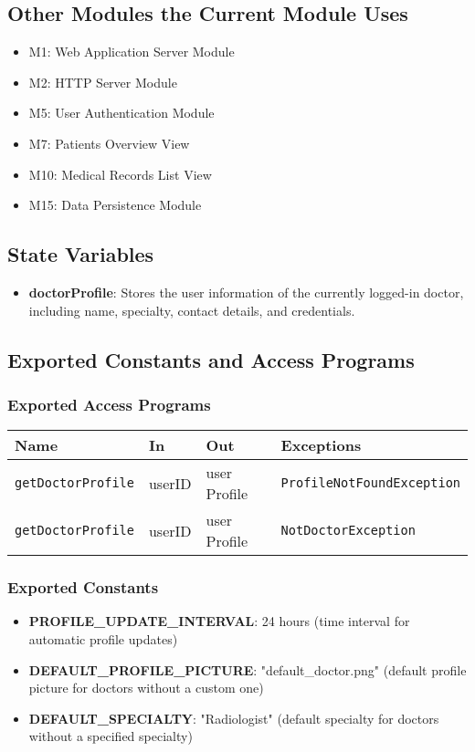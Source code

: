 \documentclass[12pt, titlepage]{article}
\begin{document}
\subsection{Other Modules the Current Module Uses}
\begin{itemize}
    \item M1: Web Application Server Module
    \item M2: HTTP Server Module
    \item M5: User Authentication Module
    \item M7: Patients Overview View
    \item M10: Medical Records List View
    \item M15: Data Persistence Module
\end{itemize}

\subsection{State Variables}
\begin{itemize}
    \item \textbf{doctorProfile}: Stores the user information of the currently logged-in doctor, including name, specialty, contact details, and credentials.
\end{itemize}

\subsection{Exported Constants and Access Programs}
\subsubsection{Exported Access Programs}
\begin{tabular}{|l|l|l|l|}
    \hline
    \textbf{Name} & \textbf{In} & \textbf{Out} & \textbf{Exceptions} \\
    \hline 
    \texttt{getDoctorProfile} & userID & user Profile & \texttt{ProfileNotFoundException} \\
    \hline
    \texttt{getDoctorProfile} & userID & user Profile & \texttt{NotDoctorException } \\
    \hline
\end{tabular}

\subsubsection{Exported Constants}
\begin{itemize}
\item \textbf{PROFILE\_UPDATE\_INTERVAL}: 24 hours (time interval for automatic profile updates)
\item \textbf{DEFAULT\_PROFILE\_PICTURE}: "default\_doctor.png" (default profile picture for doctors without a custom one)
\item \textbf{DEFAULT\_SPECIALTY}: "Radiologist" (default specialty for doctors without a specified specialty)
\end{itemize}
\end{document}
